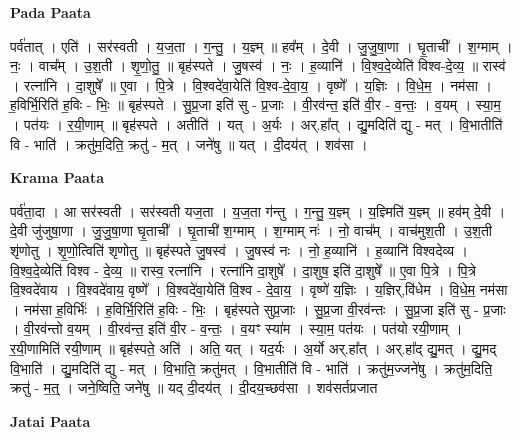 \documentclass[17pt]{extarticle}
\begin{document}
\textbf{Pada Paata} \newline

पर्व॑तात् । एति॑ । सर॑स्वती । य॒ज॒ता । ग॒न्तु॒ । य॒ज्ञ्म् ॥ हव᳚म् । दे॒वी । जु॒जु॒षा॒णा । घृ॒ताची᳚ । श॒ग्माम् । नः॒ । वाच᳚म् । उ॒श॒ती । शृ॒णो॒तु॒ ॥ बृह॑स्पते । जु॒षस्व॑ । नः॒ । ह॒व्यानि॑ । वि॒श्व॒दे॒व्येति॑ विश्व-दे॒व्य॒ ॥ रास्व॑ । रत्ना॑नि । दा॒शुषे᳚ ॥ ए॒वा । पि॒त्रे । वि॒श्वदे॑वा॒येति॑ वि॒श्व-दे॒वा॒य॒ । वृष्णे᳚ । य॒ज्ञिः । वि॒धे॒म॒ । नम॑सा । ह॒विर्भि॒रिति॑ ह॒विः - भिः॒ ॥ बृह॑स्पते । सु॒प्र॒जा इति॑ सु - प्र॒जाः । वी॒रव॑न्त॒ इति॑ वी॒र - व॒न्तः॒ । व॒यम् । स्या॒म॒ । पत॑यः । र॒यी॒णाम् ॥ बृह॑स्पते । अतीति॑ । यत् । अ॒र्यः । अर्.हा᳚त् । द्यु॒मदिति॑ द्यु - मत् । वि॒भातीति॑ वि - भाति॑ । क्रतु॑म॒दिति॒ क्रतु॑ - म॒त् । जने॑षु ॥ यत् । दी॒दय॑त् । शव॑सा ।  \newline


\textbf{Krama Paata} \newline

पर्व॑ता॒दा । आ सर॑स्वती । सर॑स्वती यज॒ता । य॒ज॒ता ग॑न्तु । ग॒न्तु॒ य॒ज्ञ्म् । य॒ज्ञ्मिति॑ य॒ज्ञ्म् ॥ हव॑म् दे॒वी । दे॒वी जु॑जुषा॒णा । जु॒जु॒षा॒णा घृ॒ताची᳚ । घृ॒ताची॑ श॒ग्माम् । श॒ग्माम् नः॑ । नो॒ वाच᳚म् । वाच॑मुश॒ती । उ॒श॒ती शृ॑णोतु । शृ॒णो॒त्विति॑ शृणोतु ॥ बृह॑स्पते जु॒षस्व॑ । जु॒षस्व॑ नः । नो॒ ह॒व्यानि॑ । ह॒व्यानि॑ विश्वदेव्य । वि॒श्व॒दे॒व्येति॑ विश्व - दे॒व्य॒ ॥ रास्व॒ रत्ना॑नि । रत्ना॑नि दा॒शुषे᳚ । दा॒शुष॒ इति॑ दा॒शुषे᳚ ॥ ए॒वा पि॒त्रे । पि॒त्रे वि॒श्वदे॑वाय । वि॒श्वदे॑वाय॒ वृष्णे᳚ । वि॒श्वदे॑वा॒येति॑ वि॒श्व - दे॒वा॒य॒ । वृष्णे॑ य॒ज्ञिः । य॒ज्ञिर्,वि॑धेम । वि॒धे॒म॒ नम॑सा । नम॑सा ह॒विर्भिः॑ । ह॒विर्भि॒रिति॑ ह॒विः - भिः॒ । बृह॑स्पते सुप्र॒जाः । सु॒प्र॒जा वी॒रव॑न्तः । सु॒प्र॒जा इति॑ सु - प्र॒जाः । वी॒रव॑न्तो व॒यम् । वी॒रव॑न्त॒ इति॑ वी॒र - व॒न्तः॒ । व॒यꣳ स्या॑म । स्या॒म॒ पत॑यः । पत॑यो रयी॒णाम् । र॒यी॒णामिति॑ रयी॒णाम् ॥ बृह॑स्पते॒ अति॑ । अति॒ यत् । यद॒र्यः । अ॒र्यो अर्.हा᳚त् । अर्.हा᳚द् द्यु॒मत् । द्यु॒मद् वि॒भाति॑ । द्यु॒मदिति॑ द्यु - मत् । वि॒भाति॒ क्रतु॑मत् । वि॒भातीति॑ वि - भाति॑ । क्रतु॑म॒ज्जने॑षु । क्रतु॑म॒दिति॒ क्रतु॑ - म॒त्॒ । जने॒ष्विति॒ जने॑षु ॥ यद् दी॒दय॑त् । दी॒दय॒च्छव॑सा । शव॑सर्तप्रजात \newline

\textbf{Jatai Paata} \newline
\end{document}
